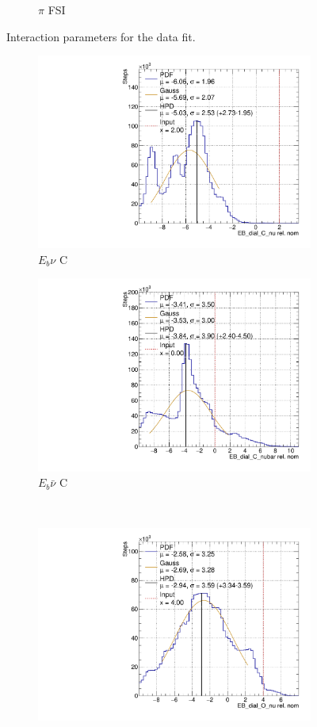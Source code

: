 \begin{figure}[!htbp]
\begin{subfigure}{0.49\textwidth}
  \caption{$\pi$ FSI}
\end{subfigure}
\caption{Interaction parameters for the data fit.}
\label{fig:datxsec}
\end{figure}

\begin{figure}[!htbp]
\centering
\begin{subfigure}{.48\textwidth}
  \centering
  \includegraphics[width=0.73\linewidth]{figs/EB_dial_C_nuDataPoly}
  \caption{$E_{b}\nu$ C}
\end{subfigure}
\begin{subfigure}{.48\textwidth}
  \centering
  \includegraphics[width=0.73\linewidth]{figs/EB_dial_C_nubarDataPoly}
  \caption{$E_{b}\bar{\nu}$ C}
\end{subfigure} \\
\begin{subfigure}{.48\textwidth}
  \centering
  \includegraphics[width=0.73\linewidth]{figs/EB_dial_O_nuDataPoly}

\end{subfigure}
\end{figure}
